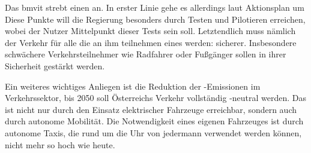 Das \ac{bmvit} strebt einen  an. In erster Linie gehe es allerdings laut Aktionsplan um  Diese Punkte will die Regierung besonders durch Testen und Pilotieren erreichen, wobei der Nutzer Mittelpunkt dieser Tests sein soll. Letztendlich muss nämlich der Verkehr für alle die an ihm teilnehmen eines werden: sicherer. Insbesondere schwächere Verkehrsteilnehmer wie Radfahrer oder Fußgänger sollen in ihrer Sicherheit gestärkt werden.

Ein weiteres wichtiges Anliegen ist die Reduktion der -Emissionen im Verkehrssektor, bis 2050 soll Österreichs Verkehr vollständig -neutral werden. Das ist nicht nur durch den Einsatz elektrischer Fahrzeuge erreichbar, sondern auch durch autonome Mobilität. Die Notwendigkeit eines eigenen Fahrzeuges ist durch autonome Taxis, die rund um die Uhr von jedermann verwendet werden können, nicht mehr so hoch wie heute.
